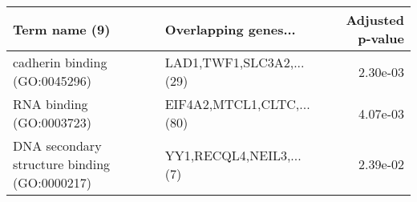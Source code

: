\begin{tabular}{llr}
\toprule
                               Term name (9) &      Overlapping genes... &  Adjusted p-value \\
\midrule
               cadherin binding (GO:0045296) &  LAD1,TWF1,SLC3A2,...(29) &          2.30e-03 \\
                    RNA binding (GO:0003723) & EIF4A2,MTCL1,CLTC,...(80) &          4.07e-03 \\
DNA secondary structure binding (GO:0000217) &   YY1,RECQL4,NEIL3,...(7) &          2.39e-02 \\
\bottomrule
\end{tabular}
